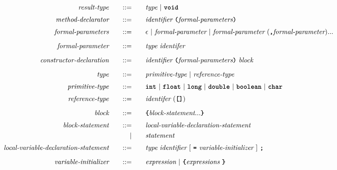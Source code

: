 \begin{alignat*}{9}
&& \textit{result-type}                          && \quad ::= & \quad && \textit{type} \ | \ \textbf{\texttt{void}} && \\[1mm]
&& \textit{method-declarator}                    && \quad ::= & \quad && \textit{identifier} \ \textbf{\texttt{(}} \textit{formal-parameters} \textbf{\texttt{)}} && \\[1mm]
&& \textit{formal-parameters}                     && \quad ::= & \quad && \epsilon \ | \ \textit{formal-parameter} \
 | \ \textit{formal-parameter} \ (\textbf{\texttt{,}} \textit{formal-parameter}) ... &&\\[2mm]
&& \textit{formal-parameter}                     && \quad ::= & \quad && \textit{type} \ \textit{identifer} && \\[2mm]
&& \textit{constructor-declaration}              && \quad ::= & \quad && \textit{identifier} \ \textbf{\texttt{(}} \textit{formal-parameters} \textbf{\texttt{)}} \ \textit{block} && \\[2mm]
&& \textit{type}                                 && \quad ::= & \quad && \textit{primitive-type} \ | \ \textit{reference-type} && \\[1mm]
&& \textit{primitive-type}                       && \quad ::= & \quad && \textbf{\texttt{int}} \ | \ \textbf{\texttt{float}} \ | \ \textbf{\texttt{long}} \ | \ \textbf{\texttt{double}} \ | \ \textbf{\texttt{boolean}} \ | \ \textbf{\texttt{char}} && \\[1mm]
&& \textit{reference-type}                       && \quad ::= & \quad && \textit{identifer} \ (\textbf{\texttt{\string[]}})&& \\[2mm]
&& \textit{block}                                && \quad ::= & \quad && \textbf{\texttt{\{}} \textit{block-statement} ... \textbf{\texttt{\}}} && \\[1mm]
&& \textit{block-statement}                      && \quad ::= & \quad && \textit{local-variable-declaration-statement} && \\
&&                                               &&         | & \quad && \textit{statement} && \\[1mm]
&& \textit{local-variable-declaration-statement} && \quad ::= & \quad && \textit{type} \ \textit{identifier} \ [ \ \textbf{\texttt{=}} \ \textit{variable-initializer} \ ] \ \textbf{\texttt{;}} && \\[2mm]
&& \textit{variable-initializer} && \quad ::= & \quad && \textit{expression} \ | \ \textbf{\texttt{\{}} \textit{expressions} \ \textbf{\texttt{\}}} && \\[2mm]

\end{alignat*}
